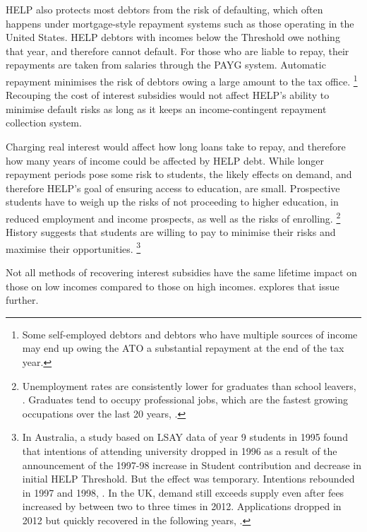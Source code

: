 \documentclass{grattan}
\begin{document}
\gls{HELP} also protects most debtors from the risk of defaulting, which often happens under mortgage-style repayment systems such as those operating in the United States.
\gls{HELP} debtors with incomes below the \gls{Threshold} owe nothing that year, and therefore cannot default.
For those who are liable to repay, their repayments are taken from salaries through the \gls{PAYG} system.
Automatic repayment minimises the risk of debtors owing a large amount to the tax office.%
   \footnote{Some self-employed debtors and debtors who have multiple sources of income may end up owing the \gls{ATO} a substantial repayment at the end of the tax year.}
Recouping the cost of interest subsidies would not affect \gls{HELP}'s ability to minimise default risks as long as it keeps an income-contingent repayment collection system.

Charging real interest would affect how long loans take to repay, and therefore how many years of income could be affected by \gls{HELP} debt.
While longer repayment periods pose some risk to students, the likely effects on demand, and therefore \gls{HELP}'s goal of ensuring access to education, are small.
Prospective students have to weigh up the risks of not proceeding to higher education, in reduced employment and income prospects, as well as the risks of enrolling.%
   \footnote{Unemployment rates are consistently lower for graduates than school leavers, \textcite[][Table 10]{Norton2016MappingAustralianhigher}.
Graduates tend to occupy professional jobs, which are the fastest growing occupations over the last 20 years, \textcite{ABS2015LabourforceAustralia}.} History suggests that students are willing to pay to minimise their risks and maximise their opportunities.%
   \footnote{In Australia, a study based on LSAY data of year 9 students in 1995 found that intentions of attending university dropped in 1996 as a result of the announcement of the 1997-98 increase in \gls{Student contribution} and decrease in initial \gls{HELP} \gls{Threshold}.
But the effect was temporary.
Intentions rebounded in 1997 and 1998, \textcite[][505]{Chapman2005accessimplicationsincome}.
In the UK, demand still exceeds supply even after fees increased by between two to three times in 2012.
Applications dropped in 2012 but quickly recovered in the following years, \textcite[][Figures~4 and~27]{UCAS20152015endcycle}.}

Not all methods of recovering interest subsidies have the same lifetime impact on those on low incomes compared to those on high incomes.
 explores that issue further.
\end{document}

